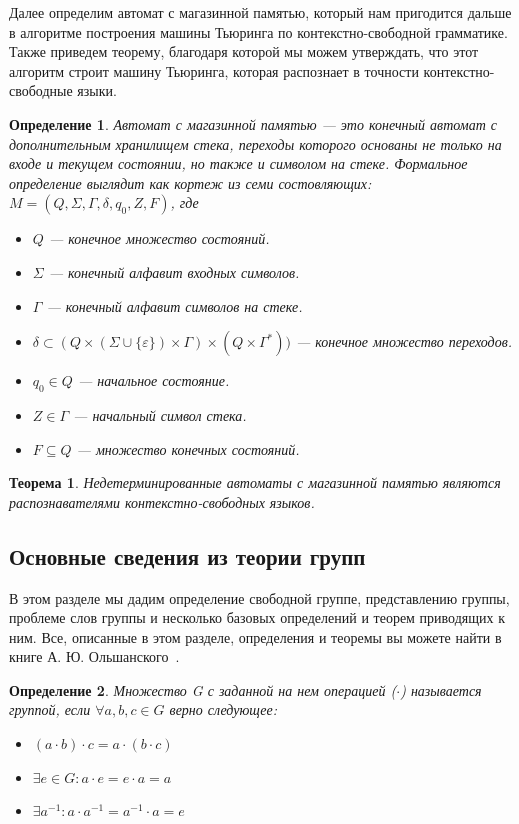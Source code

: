 \documentclass[14pt]{matmex-diploma-custom}
\newtheorem{thm}{Теорема}[subsection]
\newtheorem{defn}{Определение}[subsection]
\begin{document}
Далее определим автомат с магазинной памятью, который нам пригодится дальше в алгоритме
построения машины Тьюринга по контекстно-свободной грамматике. Также приведем теорему, благодаря которой мы можем
утверждать, что этот алгоритм строит машину Тьюринга, которая распознает в точности контекстно-свободные
языки.

\begin{defn}
Автомат с магазинной памятью --- это конечный автомат с дополнительным хранилищем стека, 
переходы которого основаны не только на входе и текущем состоянии, но также и символом на стеке. 
Формальное определение выглядит как кортеж из семи состовляющих:
$M=(Q,\Sigma ,\Gamma ,\delta ,q_{0},Z,F)$, где
\begin{itemize}
    \item $Q$ --- конечное множество состояний.
    \item $\Sigma$ --- конечный алфавит входных символов. 
    \item $\Gamma$ --- конечный алфавит символов на стеке.
    \item $\delta \subset (Q \times (\Sigma \cup \{\varepsilon \})\times \Gamma) \times (Q\times \Gamma^{*}))$ --- конечное множество переходов.
    \item $q_{0}\in Q$ --- начальное состояние.
    \item $Z\in \Gamma$ --- начальный символ стека.
    \item $F\subseteq Q$ --- множество конечных состояний.
\end{itemize}
\end{defn}

\begin{thm} \label{thmpda}
Недетерминированные автоматы с магазинной памятью являются распознавателями контекстно-свободных языков.
\end{thm}

\subsection{Основные сведения из теории групп}

В этом разделе мы дадим определение свободной группе, представлению группы,
проблеме слов группы и несколько базовых определений и теорем приводящих к ним. Все, описанные в этом
разделе, определения и теоремы вы можете найти в книге А. Ю. Ольшанского~\cite{geomTheoryGroup}.

\begin{defn}
Множество G с заданной на нем операцией ($ \cdot $) называется группой, если $ \forall a, b, c \in G $
верно следующее:
\begin{itemize}
\item $(a \cdot b) \cdot c = a \cdot (b \cdot c)$
\item $\exists e \in G : a \cdot e = e \cdot a = a$
\item $\exists a^{-1} : a \cdot a^{-1} = a^{-1} \cdot a = e$
\end{itemize}
\end{defn}
\end{document}
